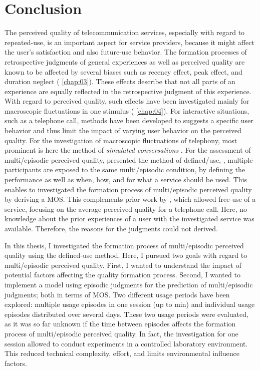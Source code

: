 \chapter{Conclusion}\label{chap:discussion}
The perceived quality of telecommunication services, especially with regard to repeated-use, is an important aspect for service providers, because it might affect the user's satisfaction and also future-use behavior.
The formation processes of retrospective judgments of general experiences as well as perceived quality are known to be affected by several biases such as recency effect, peak effect, and duration neglect (\cf{} \autoref{chap:03}).
These effects describe that not all parts of an experience are equally reflected in the retrospective judgment of this experience.
With regard to perceived quality, such effects have been investigated mainly for macroscopic fluctuations in one stimulus (\cf{} \autoref{chap:04}).
For interactive situations, such as a telephone call, methods have been developed to suggests a specific user behavior and thus limit the impact of varying user behavior on the perceived quality.
For the investigation of macroscopic fluctuations of telephony, most prominent is here the method of \emph{simulated conversations} \citep{weiss_modeling_2009}.
For the assessment of multi\-/episodic perceived quality, \citet{moller_single-call_2011} presented the method of defined\-/use, \ie, multiple participants are exposed to the same multi\-/episodic condition, by defining the performance as well as when, how, and for what a service should be used.
This enables to investigated the formation process of multi\-/episodic perceived quality by deriving a \ac{MOS}.
This complements prior work by \citet{duncanson_average_1969}, which allowed free-use of a service, focusing on the average perceived quality for a telephone call.
Here, no knowledge about the prior experiences of a user with the investigated service was available.
Therefore, the reasons for the judgments could not derived.

In this thesis, I investigated the formation process of multi\-/episodic perceived quality using the  defined-use method.
Here, I pursued two goals with regard to multi\-/episodic perceived quality.
First, I wanted to understand the impact of potential factors affecting the quality formation process.
Second, I wanted to implement a model using episodic judgments for the prediction of multi\-/episodic judgments; both in terms of \ac{MOS}.
Two different usage periods have been explored: multiple usage episodes in one session (up to \unit[45]{min}) and individual usage episodes distributed over several days.
These two usage periods were evaluated, as it was so far unknown if the time between episodes affects the formation process of multi\-/episodic perceived quality.
In fact, the investigation for one session allowed to conduct experiments in a controlled laboratory environment.
This reduced technical complexity, effort, and limits environmental influence factors.

